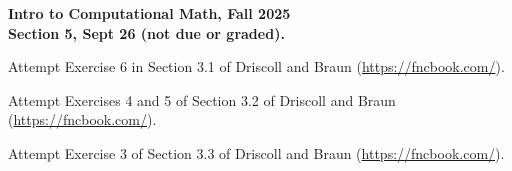 \documentclass[11pt]{article}
\begin{document}
\begin{center}
{\bf Intro to Computational Math, Fall 2025\\
Section 5, Sept 26 (not due or graded).\\
}
\end{center}


 Attempt Exercise 6 in Section 3.1 of Driscoll and Braun (\url{https://fncbook.com/}).

\vskip1cm

 Attempt Exercises 4 and 5 of Section 3.2 of Driscoll and Braun (\url{https://fncbook.com/}).

\vskip1cm

 Attempt Exercise 3 of Section 3.3 of Driscoll and Braun (\url{https://fncbook.com/}).
\end{document}
